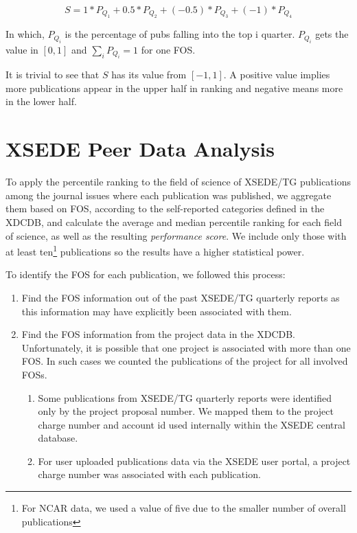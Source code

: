 \documentclass[10pt, conference, compsocconf]{IEEEtran}
\begin{document}
\[	S = 1*P_{Q_1} + 0.5*P_{Q_2}+ (-0.5)*P_{Q_3} + (-1)*P_{Q_4} \]

In which, $P_{Q_i}$ is the percentage of pubs falling into the top i quarter. $P_{Q_i}$ gets the value in $[0,1]$ and $\sum_{i} {P_{Q_i}} = 1$ for one FOS.

It is trivial to see that $S$ has its value from $[-1, 1]$. A positive value implies more publications appear in the upper half in ranking and negative means more in the lower half.

\section{XSEDE Peer Data Analysis}
\label{S:xsede}

To apply the percentile ranking to the field of science of XSEDE/TG publications among the journal issues where each publication was published, we aggregate them based on FOS, according to the self-reported categories defined in the XDCDB, and calculate the average and median percentile ranking for each field of science, as well as the resulting  \emph{performance score}. We include only those with at least ten\footnote{For NCAR data, we used a value of five due to the smaller number of overall publications} publications so the results have a higher statistical power. 



To identify the FOS for each publication, we followed this process:

\begin{enumerate}

\item Find the FOS information out of the past XSEDE/TG quarterly reports as this information may have explicitly been associated with them.

\item Find the FOS information from the project data in the XDCDB. Unfortunately, it is possible that one project is associated with more than one FOS. In such cases we counted the publications of the project for all involved FOSs.

\begin{enumerate}

\item Some publications from XSEDE/TG quarterly reports were identified only by the project proposal number. We mapped them to the project charge number and account id used internally within the XSEDE central database.

\item For user uploaded publications data via the XSEDE user portal, a project charge number was associated with each publication.

\end{enumerate}

\end{enumerate}
\end{document}

